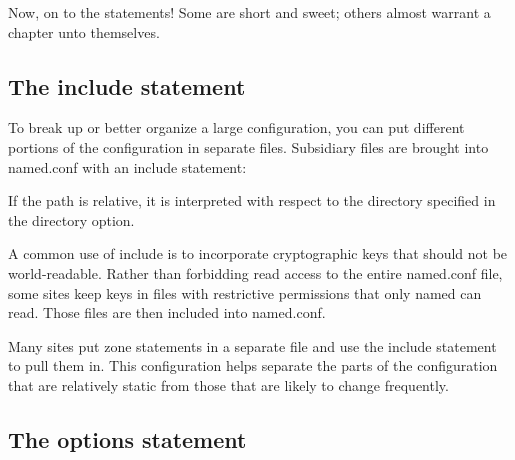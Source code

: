 Now, on to the statements! Some are short and sweet; others almost
warrant a chapter unto themselves.

\protect\hypertarget{part0024_split_036.html}{}{}

\hypertarget{part0024_split_036.htmlux5cux23_idContainer1069}{}
\hypertarget{part0024_split_036.htmlux5cux23calibre_pb_35}{%
\subsection[The {include}
statement]{\texorpdfstring{\protect\hypertarget{part0024_split_036.htmlux5cux23_idTextAnchor897}{}{}The
{include}
statement}{The include statement}}\label{part0024_split_036.htmlux5cux23calibre_pb_35}}

\protect\hypertarget{part0024_split_036.htmlux5cux23_idIndexMarker2119}{}{}To
break up or better organize a large configuration, you can put different
portions of the configuration in separate files. Subsidiary files are
brought into {named.conf} with an {include} statement:


If the {path} is relative, it is interpreted with respect to the
directory specified in the {directory} option.

A common use of {include} is to incorporate cryptographic keys that
should not be world-readable. Rather than forbidding read access to the
entire {named.conf} file, some sites keep keys in files with restrictive
permissions that only {named} can read. Those files are then {include}d
into {named.conf}.

Many sites put {zone} statements in a separate file and use the
{include} statement to pull them in. This configuration helps separate
the parts of the configuration that are relatively static from those
that are likely to change frequently.

\protect\hypertarget{part0024_split_037.html}{}{}

\hypertarget{part0024_split_037.htmlux5cux23_idContainer1069}{}
\hypertarget{part0024_split_037.htmlux5cux23calibre_pb_36}{%
\subsection[The {options}
statement]{\texorpdfstring{\protect\hypertarget{part0024_split_037.htmlux5cux23_idTextAnchor898}{}{}The
{options}
statement}{The options statement}}\label{part0024_split_037.htmlux5cux23calibre_pb_36}}

